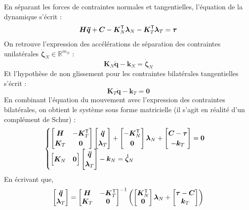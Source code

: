 En séparant les forces de contraintes normales et tangentielles, 
l'équation de la dynamique s'écrit :
$$
\bm{H}\bm{\ddot{q}} + \bm{C} 
- \bm{K}_{N}^{\mathsf{T}}\bm{\lambda}_{N} 
- \bm{K}_{T}^{\mathsf{T}}\bm{\lambda}_{T} 
= \bm{\tau}
$$
On retrouve l'expression des accélérations de séparation des contraintes unilatérales
$\bm{\dot{\zeta}}_{N} \in \mathbb{R}^{m_{N}}$ :
$$
\bm{K}_{N}\bm{\ddot{q}} - \bm{k}_{N} = \bm{\dot{\zeta}}_{N}
$$
Et l'hypothèse de non glissement pour les contraintes bilatérales
tangentielles s'écrit :
$$
\bm{K}_{T}\bm{\ddot{q}} - \bm{k}_{T} = \bm{0}
$$
En combinant l'équation du mouvement avec l'expression des
contraintes bilatérales,  on obtient le système sous forme matricielle 
(il s'agit en réalité d'un complément de Schur) :
$$
\begin{cases}
\begin{bmatrix}
    \bm{H} & -\bm{K}^{\mathsf{T}}_{T} \\
    \bm{K}_{T} & \bm{0} \\
\end{bmatrix}
\begin{bmatrix}
    \bm{\ddot{q}} \\
    \bm{\lambda}_{T} \\
\end{bmatrix}
+
\begin{bmatrix}
    -\bm{K}^{\mathsf{T}}_{N} \\
    \bm{0} \\
\end{bmatrix}
\bm{\lambda}_{N}
+
\begin{bmatrix}
    \bm{C} - \bm{\tau} \\
    -\bm{k}_{T} \\
\end{bmatrix}
=
\bm{0}
\\
\begin{bmatrix}
    \bm{K}_{N} & \bm{0} \\
\end{bmatrix}
\begin{bmatrix}
    \bm{\ddot{q}} \\
    \bm{\lambda}_{T} \\
\end{bmatrix}
-
\bm{k}_{N}
=
\bm{\dot{\zeta}}_{N}
\\
\end{cases}
$$
En écrivant que, 
$$
\begin{bmatrix}
    \bm{\ddot{q}} \\
    \bm{\lambda}_{T} \\
\end{bmatrix}
=
\begin{bmatrix}
    \bm{H} & -\bm{K}^{\mathsf{T}}_{T} \\
    \bm{K}_{T} & \bm{0} \\
\end{bmatrix}^{-1}
\left(
\begin{bmatrix}
    \bm{K}^{\mathsf{T}}_{N} \\
    \bm{0} \\
\end{bmatrix}
\bm{\lambda}_{N}
+
\begin{bmatrix}
    \bm{\tau} - \bm{C} \\
    \bm{k}_{T} \\
\end{bmatrix}
\right)
$$
